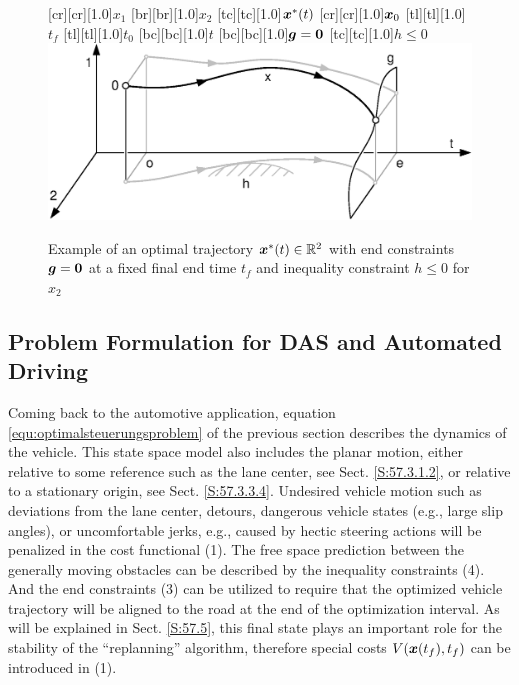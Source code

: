 \begin{figure}[ht]
[cr][cr][1.0]{$x_1$}
[br][br][1.0]{$x_2$}
[tc][tc][1.0]{$\boldsymbol{x}^\ast(t)$}
[cr][cr][1.0]{$\boldsymbol{x}_0$}
[tl][tl][1.0]{$t_f$}
[tl][tl][1.0]{$t_0$}
[bc][bc][1.0]{$t$}
[bc][bc][1.0]{$\boldsymbol{g}=\boldsymbol{0}$}
[tc][tc][1.0]{$h\leq0$}
	\centering
  	\includegraphics[width=1.\textwidth,clip, trim = 0cm 0cm 0cm 0cm]{pics/2_Darstellung_dynamische_Optimierung_endvorgabe.eps}
  	\caption[Example of an optimal trajectory]{Example of an optimal trajectory $\boldsymbol{x}^\ast (t)\in \mathbb{R}^2$ with end constraints $\boldsymbol{g}=\boldsymbol{0}$ at a fixed final end time $t_f$ and inequality constraint $h\leq 0$ for $x_2$}
    \label{fig:dynamische_Optimierung_endvorgabe}
\end{figure}

\subsection{Problem Formulation for DAS and Automated Driving}\label{S:57.2.2}
Coming back to the automotive application, equation \eqref{equ:optimalsteuerungsproblem} of the previous section describes the dynamics of the vehicle. This state space model also includes the planar motion, either relative to some reference such as the lane center, see Sect. \ref{S:57.3.1.2}, or relative to a stationary origin, see Sect. \ref{S:57.3.3.4}. Undesired vehicle motion such as deviations from the lane center, detours, dangerous vehicle states (e.g., large slip angles), or uncomfortable jerks, e.g., caused by hectic steering actions will be penalized in the cost functional (1). The free space prediction between the generally moving obstacles can be described by the inequality constraints (4). And the end constraints (3) can be utilized to require that the optimized vehicle trajectory will be aligned to the road at the end of the optimization interval. As will be explained in Sect. \ref{S:57.5}, this final state plays an important role for the stability of the “replanning” algorithm, therefore special costs 
$V(\boldsymbol{x}(t_f), t_f)$ can be introduced in (1). 

